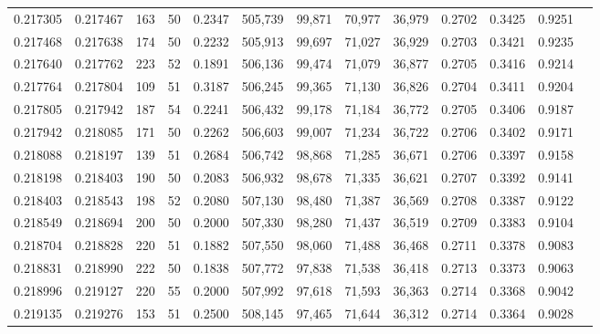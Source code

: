 \begin{tabular}{rrrrrrrrrrrrr}
0.217305 & 0.217467 &   163 &  50 &                                     0.2347 & 505,739 &  99,871 &  70,977 &  36,979 & 0.2702 & 0.3425 & 0.9251 \\
0.217468 & 0.217638 &   174 &  50 &                                     0.2232 & 505,913 &  99,697 &  71,027 &  36,929 & 0.2703 & 0.3421 & 0.9235 \\
0.217640 & 0.217762 &   223 &  52 &                                     0.1891 & 506,136 &  99,474 &  71,079 &  36,877 & 0.2705 & 0.3416 & 0.9214 \\
0.217764 & 0.217804 &   109 &  51 &                                     0.3187 & 506,245 &  99,365 &  71,130 &  36,826 & 0.2704 & 0.3411 & 0.9204 \\
0.217805 & 0.217942 &   187 &  54 &                                     0.2241 & 506,432 &  99,178 &  71,184 &  36,772 & 0.2705 & 0.3406 & 0.9187 \\
0.217942 & 0.218085 &   171 &  50 &                                     0.2262 & 506,603 &  99,007 &  71,234 &  36,722 & 0.2706 & 0.3402 & 0.9171 \\
0.218088 & 0.218197 &   139 &  51 &                                     0.2684 & 506,742 &  98,868 &  71,285 &  36,671 & 0.2706 & 0.3397 & 0.9158 \\
0.218198 & 0.218403 &   190 &  50 &                                     0.2083 & 506,932 &  98,678 &  71,335 &  36,621 & 0.2707 & 0.3392 & 0.9141 \\
0.218403 & 0.218543 &   198 &  52 &                                     0.2080 & 507,130 &  98,480 &  71,387 &  36,569 & 0.2708 & 0.3387 & 0.9122 \\
0.218549 & 0.218694 &   200 &  50 &                                     0.2000 & 507,330 &  98,280 &  71,437 &  36,519 & 0.2709 & 0.3383 & 0.9104 \\
0.218704 & 0.218828 &   220 &  51 &                                     0.1882 & 507,550 &  98,060 &  71,488 &  36,468 & 0.2711 & 0.3378 & 0.9083 \\
0.218831 & 0.218990 &   222 &  50 &                                     0.1838 & 507,772 &  97,838 &  71,538 &  36,418 & 0.2713 & 0.3373 & 0.9063 \\
0.218996 & 0.219127 &   220 &  55 &                                     0.2000 & 507,992 &  97,618 &  71,593 &  36,363 & 0.2714 & 0.3368 & 0.9042 \\
0.219135 & 0.219276 &   153 &  51 &                                     0.2500 & 508,145 &  97,465 &  71,644 &  36,312 & 0.2714 & 0.3364 & 0.9028 \\

\end{tabular}
